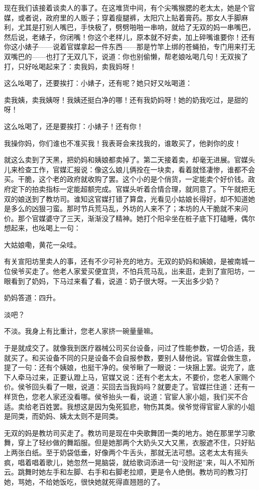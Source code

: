 现在我们该接着谈卖人的事了。在这堆货中间，有个尖嘴猴腮的老太太，她是个官媒，或者说，政府里的人贩子；穿着瘦腿裤，太阳穴上贴着膏药。那女人手脚麻利，尤其是打别人嘴巴，手快极了，劈劈啪啪一串响，就给了无双的妈一串嘴巴，然后说，老婊子，你闭嘴！你这个老样儿，原本就不好卖，加上碎嘴谁要你！还有你这小婊子——说着官媒拿起一件东西——那是竹竿上绑的苍蝇拍，专门用来打无双嘴巴的——也打了无双几下，说道：你也别偷懒，帮老娘吆喝几句！无双挨了打，只好吆喝起来了：卖我妈，卖我妈呀！ 

这么吆喝了，还要挨打：小婊子，还有呢？她只好又吆喝道： 

卖我姨，卖我姨呀！我姨还挺白净的哪！还有我奶妈呀！她的奶我吃过，是甜的呀！ 

这么吆喝了，还是要挨打：小婊子！还有你！ 

我操你妈，你们谁也不准买我！我表哥会来找我的，谁敢买了，他剥你的皮！ 

就这么卖到了天黑，把奶妈和姨娘都卖掉了。第二天接着卖，却毫无进展。官媒头儿来检查工作，官媒汇报说：像这么娘儿俩拴在一块卖，看着就怪凄惨，谁都不会买。干脆，这个老的政府就收购了罢。这个小的是个俏货，一定能卖个好价钱。政府定下的拍卖指标一定能超额完成。官媒头听着合情合理，就同意了。下午就把无双的娘送到了教坊司。谁知这官媒打错了算盘，光看见小姑娘长得好，却不知道她是多么的凶狠刁蛮。那时节兵荒马乱，外坊的人来不了；本坊的人干脆就不来问价。那个官媒婆守了三天，渐渐没了精神。她打个阳伞坐在桩子底下打磕睡，偶尔想起来，也吆喝上一句： 

大姑娘嘞，黄花一朵哇。 

有关宣阳坊里卖人的事，还有不少可补充的地方。无双的奶妈和姨娘，是被南城一位侯爷买走了。他老人家爱买便宜货，不怕兵荒马乱，出来逛，走到了宣阳坊，一眼看到了奶妈，下马过来看了看，说道：奶子很大呀。一天出多少奶？ 

奶妈答道：四升。 

淡吧？ 

不淡。我身上有比重计，您老人家挤一碗量量嘛。 

于是就成交了。就像我到医疗器械公司买台设备，问过了性能参数，一切合适，我就买了。和买设备不同的只是设备不会自报参数，要别人替他说。官媒会做生意，提了一句：还有个姨娘，也挺干净的。侯爷瞅了一眼说：一块捆上罢。说完了，底下人牵马过来，正要认蹬上马，官媒又说：还有个老太太，不要价，您老人家赐个价。侯爷回头看了一眼，说道：买回去当我妈吗？就要走了。官媒拦住道：还有一样货色，您老人家还没看哪。侯爷抬头一看，说道：官宦人家小姐，我们买不合适。卖给老百姓罢。我想这是因为兔死狐悲，物伤其类。侯爷觉得官宦人家的小姐是同类，而奶妈、姨太太则不是同类。 

无双的妈是教坊司买走了。教坊司是现在中央歌舞团一类的地方。她在那里学习歌舞，穿上了轻纱做的舞蹈服。但是她那两个大奶头又大又黑，衣服遮不住，只好贴上两张白纸。至于奶袋低垂，好像两个牛舌头，那就无法可想。这老太太有摇头疯，唱着唱着歌儿，她忽然一晃脑袋，就给歌词添进一句“没附逆”来，叫人不知所云。跳舞时她左手和左脚、右手和右脚老拉顺，更是令人绝倒。教坊司的教习打她，骂她，不给她饭吃，很快她就死得直翘翘的了。 

